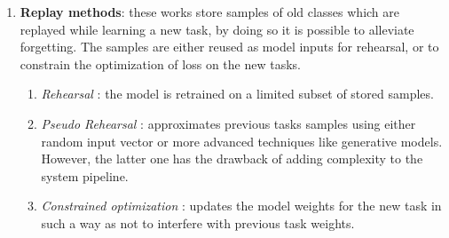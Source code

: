 \begin{enumerate}
    \item \textbf{Replay methods}: these works store samples of old classes which are replayed while learning a new task, by doing so it is possible to alleviate forgetting.
    The samples are either reused as model inputs for rehearsal, or to constrain the optimization of loss on the new tasks.

    \begin{enumerate}
        \item \textit{Rehearsal} \cite{rebuffi2017icarl, rolnick2019experience, isele2018selective, chaudhry2019continual, de2021continual}: the model is retrained on a limited subset of stored samples.
        \item \textit{Pseudo Rehearsal} \cite{shin2017continual, atkinson1802pseudo, lavda2018continual, ramapuram2020lifelong}: approximates previous tasks samples using either random input vector or more advanced techniques like generative models. However, the latter one has the drawback of adding complexity to the system pipeline.
        \item \textit{Constrained optimization} \cite{lopez2017gradient, chaudhry2018efficient, aljundi2019online}: updates the model weights for the new task in such a way as not to interfere with previous task weights.
    \end{enumerate}
    

\end{enumerate}
